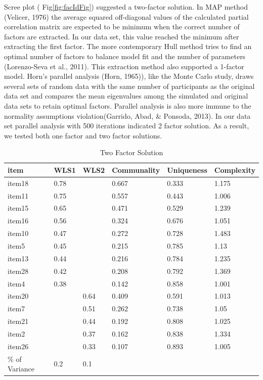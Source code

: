 \documentclass[
  man]{apa6}
\begin{document}
Scree plot ( Fig\ref{fig:facIdFig}) suggested a two-factor solution. In MAP method (Velicer, 1976) the average squared off-diagonal values of the calculated partial correlation matrix are expected to be minimum when the correct number of factors are extracted. In our data set, this value reached the minimum after extracting the first factor. The more contemporary Hull method tries to find an optimal number of factors to balance model fit and the number of parameters (Lorenzo-Seva et al., 2011). This extraction method also supported a 1-factor model. Horn's parallel analysis (Horn, 1965)), like the Monte Carlo study, draws several sets of random data with the same number of participants as the original data set and compares the mean eigenvalues among the simulated and original data sets to retain optimal factors. Parallel analysis is also more immune to the normality assumptions violation(Garrido, Abad, \& Ponsoda, 2013). In our data set parallel analysis with 500 iterations indicated 2 factor solution. As a result, we tested both one factor and two factor solutions.

\begin{table}[tbp]

\begin{center}
\begin{threeparttable}

\caption{\label{tab:TabEFA2}Two Factor Solution}

\begin{tabular}{llllll}
\toprule
item & \multicolumn{1}{c}{WLS1} & \multicolumn{1}{c}{WLS2} & \multicolumn{1}{c}{Communality} & \multicolumn{1}{c}{Uniqueness} & \multicolumn{1}{c}{Complexity}\\
\midrule
item18 & 0.78 &  & 0.667 & 0.333 & 1.175\\
item11 & 0.75 &  & 0.557 & 0.443 & 1.006\\
item15 & 0.65 &  & 0.471 & 0.529 & 1.239\\
item16 & 0.56 &  & 0.324 & 0.676 & 1.051\\
item10 & 0.47 &  & 0.272 & 0.728 & 1.483\\
item5 & 0.45 &  & 0.215 & 0.785 & 1.13\\
item13 & 0.44 &  & 0.216 & 0.784 & 1.235\\
item28 & 0.42 &  & 0.208 & 0.792 & 1.369\\
item4 & 0.38 &  & 0.142 & 0.858 & 1.001\\
item20 &  & 0.64 & 0.409 & 0.591 & 1.013\\
item7 &  & 0.51 & 0.262 & 0.738 & 1.05\\
item21 &  & 0.44 & 0.192 & 0.808 & 1.025\\
item2 &  & 0.37 & 0.162 & 0.838 & 1.334\\
item26 &  & 0.33 & 0.107 & 0.893 & 1.005\\
\% of Variance & 0.2 & 0.1 &  &  & \\
\bottomrule
\end{tabular}

\end{threeparttable}
\end{center}

\end{table}
\end{document}
